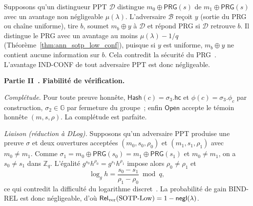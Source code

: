 \begin{sloppypar}
\begin{Preuve}
Supposons qu'un distingueur PPT $\mathcal{D}$ distingue $m_0 \oplus
\mathsf{PRG}(s)$ de $m_1 \oplus \mathsf{PRG}(s)$ avec un avantage non
n\'egligeable $\mu(\lambda)$. L'adversaire $\mathcal{B}$ re\c{c}oit
$y$ (sortie du PRG ou cha\^ine uniforme), tire $b$, soumet $m_b \oplus y$ \`a
$\mathcal{D}$ et r\'epond \og PRG\fg{} si $\mathcal{D}$ retrouve $b$. Il distingue le
PRG avec un avantage au moins $\mu(\lambda) - 1/q$ (Th\'eor\`eme~\ref{thm:ann_sotp_low_conf}), puisque si $y$ est uniforme, $m_b \oplus y$ ne
contient aucune information sur $b$. Cela contredit la s\'ecurit\'e du
PRG~\cite{BlumMicali84}. L'avantage IND-CONF de tout adversaire PPT est donc
n\'egligeable.

\medskip
\noindent\textbf{Partie II~. Fiabilit\'e de v\'erification.}

\textit{Compl\'etude.} Pour toute preuve honn\^ete, $\mathsf{Hash}(c) = \sigma_3.\mathsf{hc}$
et $\phi(c) = \sigma_3.\phi_c$ par construction, $\sigma_2 \in \mathbb{G}$ par
fermeture du groupe~; enfin $\mathsf{Open}$ accepte le t\'emoin honn\^ete $(m, s, \rho)$.
La compl\'etude est parfaite.

\textit{Liaison (r\'eduction \`a DLog).} Supposons qu'un adversaire PPT
produise une preuve $\sigma$ et deux ouvertures accept\'ees
$(m_0, s_0, \rho_0)$ et $(m_1, s_1, \rho_1)$ avec $m_0 \neq m_1$. Comme
$\sigma_1 = m_0 \oplus \mathsf{PRG}(s_0) = m_1 \oplus \mathsf{PRG}(s_1)$ et
$m_0 \neq m_1$, on a $s_0 \neq s_1$ dans $\mathbb{Z}_q$. L'\'egalit\'e
$g^{s_0} h^{\rho_0} = g^{s_1} h^{\rho_1}$ impose alors $\rho_0 \neq \rho_1$ et
\begin{equation}
\log_g h = \frac{s_0 - s_1}{\rho_1 - \rho_0} \bmod q,
\end{equation}
ce qui contredit la difficult\'e du logarithme discret~\cite{DiffieHellman76}.
La probabilit\'e de gain BIND-REL est donc n\'egligeable, d'o\`u
$\mathsf{Rel}_{\mathrm{ver}}(\mathrm{SOTP\text{-}Low}) = 1 - \mathsf{negl}(\lambda)$.
\end{Preuve}


\end{sloppypar}
